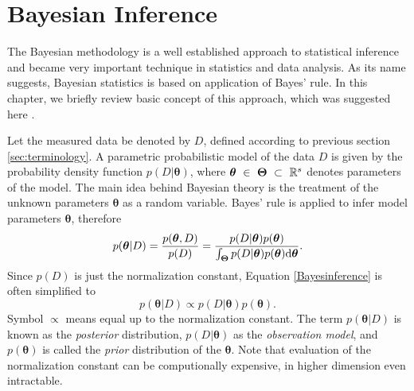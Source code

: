 \section{Bayesian Inference}
The Bayesian methodology is a well established approach to statistical inference and became very important technique in statistics and data analysis. As its name suggests, Bayesian statistics is based on application of Bayes' rule. In this chapter, we briefly review basic concept of this approach, which was suggested here \cite{smidl}. 

 Let the measured data be denoted by $D$, defined according to previous section \ref{sec:terminology}. A parametric probabilistic model of the data $D$ is given by the probability density function  $p\left(D|\boldsymbol{\theta}\right)$, where $\boldsymbol{\theta}~\in~\boldsymbol{\Theta}~\subset~\mathbb{R}^s$ denotes parameters of the model. The main idea behind Bayesian theory is the treatment of the unknown parameters $\boldsymbol{\theta}$ as a random variable.  Bayes' rule is applied to infer model parameters $\boldsymbol{\theta}$, therefore
 \begin{equation}\label{Bayesinference}
 	p(\boldsymbol{\theta} | D) = \frac{p(\boldsymbol{\theta}, D)}{p(D)} = \frac{p(D| \boldsymbol{\theta})p(\boldsymbol{\theta})}{\int_{\boldsymbol{\Theta}}p(D|\boldsymbol{\theta})p(\boldsymbol{\theta})\mathrm{d}\boldsymbol{\theta}}.
 \end{equation} 
Since $p(D)$ is just the normalization constant, Equation \eqref{Bayesinference} is often simplified to
\begin{equation}
	p(\boldsymbol{\theta} | D) \propto p(D| \boldsymbol{\theta})p(\boldsymbol{\theta}).
\end{equation} 
Symbol $\propto$ means equal up to the normalization constant. The term $p(\boldsymbol{\theta} | D)$ is known as the \emph{posterior} distribution, $p(D| \boldsymbol{\theta})$  as the \emph{observation model}, and $p(\boldsymbol{\theta})$ is called the \emph{prior} distribution of the $\boldsymbol{\theta}$. Note that evaluation of the normalization constant can be computionally expensive, in higher dimension even intractable. 


